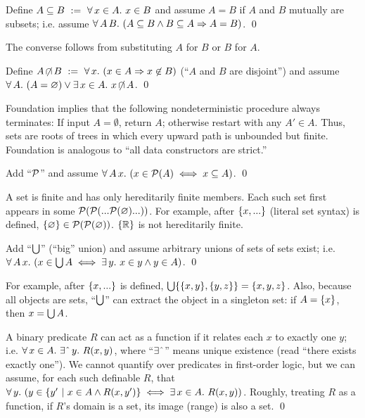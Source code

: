 \begin{axiom}[extensionality]
\label{axm:extensionality}
Define $A \subseteq B\ :=\ \forall\,{x \in A}\ldotp\,{x \in B}$ and assume $A = B$ if $A$ and $B$ mutually are subsets; i.e.
assume $\forall\,{A\,B}\ldotp\,{(A \subseteq B \wedge B \subseteq A \Rightarrow A = B)}$.
\qed
\end{axiom}

The converse follows from substituting $A$ for $B$ or $B$ for $A$.

\begin{axiom}[foundation]
\label{axm:foundation}
Define $A \operatorname{\mbox{$\not\mspace{-5mu}\cap$}} B\ :=\ \forall\,{x}\ldotp\,{(x \in A \Rightarrow x \not\in B)}$ (``$A$ and $B$ are disjoint'') and assume $\forall\,{A}\ldotp\,{(A = \varnothing) \vee \exists\,{x \in A}\ldotp\,{x \operatorname{\mbox{$\not\mspace{-5mu}\cap$}} A}}$.
\qed
\end{axiom}

Foundation implies that the following nondeterministic procedure always terminates: If input $A = \emptyset$, return $A$; otherwise restart with any $A' \in A$.
Thus, sets are roots of trees in which every upward path is unbounded but finite. Foundation is analogous to ``all data constructors are strict.''

\begin{axiom}[powerset]
\label{axm:powerset}
Add ``$\mathcal{P}$'' and assume $\forall\,{A\,x}\ldotp\,(x \in \mathcal{P}(A) \iff x \subseteq A)$.
\qed
\end{axiom}

A  set is finite and has only hereditarily finite members.
Each such set first appears in some $\mathcal{P}(\mathcal{P}(...\mathcal{P}(\varnothing)...))$.
For example, after $\{{x,...}\}$ (literal set syntax) is defined, $\{{\varnothing}\} \in \mathcal{P}(\mathcal{P}(\varnothing))$. $\{{\mathbb{R}}\}$ is not hereditarily finite.

\begin{axiom}[union]
\label{axm:union}
Add ``$\textstyle\bigcup$'' (``big'' union) and assume arbitrary unions of sets of sets exist; i.e. $\forall\,{A\,x}\ldotp\,( x \in \textstyle\bigcup A \iff \exists\,{y}\ldotp\, x \in y \wedge y \in A)$.
\qed
\end{axiom}

For example, after $\{{x,...}\}$ is defined, $\textstyle\bigcup \{{\{{x,y}\},\{{y,z}\}}\} = \{{x,y,z}\}$. Also, because all objects are sets, ``$\textstyle\bigcup$'' can extract the object in a singleton set: if $A = \{{x}\}$, then $x = \textstyle\bigcup A$.

\begin{axiom}
\label{axm:replacement}
A binary predicate $R$ can act as a function if it relates each $x$ to exactly one $y$; i.e. $\Forall{x \in A}{\ExistsOne{y}{R(x,y)}}$, where ``$\exists\char`\^$'' means unique existence (read ``there exists exactly one''). We cannot quantify over predicates in first-order logic, but we can assume, for each such definable $R$, that $\forall\,{y}\ldotp\, (y \in \lbrace {y'} \ \lvert\ {x \in A \wedge R(x,y')} \rbrace \iff \exists\,{x \in A}\ldotp\, R(x,y))$. Roughly, treating $R$ as a function, if $R$'s domain is a set, its image (range) is also a set.
\qed
\end{axiom}

